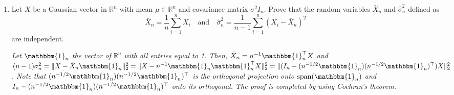 \documentclass[a4paper,10pt,fleqn]{article}
\newcommand{\rset}{\ensuremath{\mathbb{R}}}
\newcommand{\1}{\ensuremath{\mathbbm{1}}}
\begin{document}
\begin{enumerate}
\item Let $X$ be a Gaussian vector in $\rset^n$ with mean $\mu\in\rset^n$ and covariance matrix $\sigma^2 I_n$. Prove that the random variables $\bar X_n$ and $\widehat \sigma^2_n$ defined as
$$
\bar X_n = \frac{1}{n}\sum_{i=1}^n X_i\quad \mathrm{and} \quad \widehat \sigma^2_n = \frac{1}{n-1}\sum_{i=1}^n (X_i - \bar X_n)^2
$$
are independent.

\vspace{.2cm}

{\em
Let $\1_n$ the vector of $\rset^n$ with all entries equal to 1. Then, $\bar X_n = n^{-1}\1_n^\top X$ and $(n-1) \sigma^2_n = \|X - \bar X_n\1_n\|_2^2 = \|X - n^{-1}\1_n\1_n^\top X\|_2^2 = \|(I_n -  (n^{-1/2}\1_n)(n^{-1/2}\1_n)^\top) X\|_2^2$. Note that $(n^{-1/2}\1_n)(n^{-1/2}\1_n)^\top$ is the orthogonal projection onto $\mathrm{span}(\1_n)$ and $I_n -  (n^{-1/2}\1_n)(n^{-1/2}\1_n)^\top$ onto its orthogonal. The proof is completed by using Cochran's theorem.
}
\end{enumerate}
\end{document}
